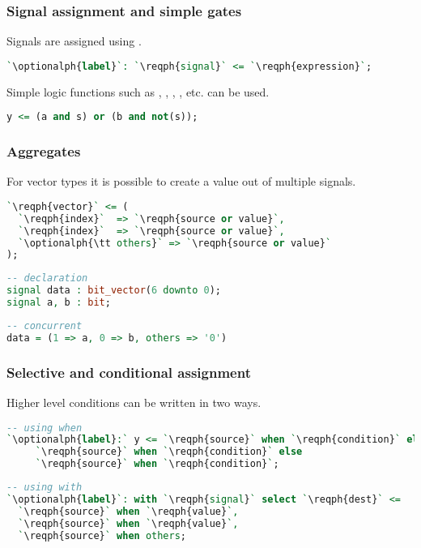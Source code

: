 \subsubsection{Signal assignment and simple gates}
Signals are assigned using \vhdl{<=}.
\begin{lstlisting}[language=vhdl]
`\optionalph{label}`: `\reqph{signal}` <= `\reqph{expression}`;
\end{lstlisting}
Simple logic functions such as , , , ,
etc. can be used.
\begin{lstlisting}[language=vhdl]
 y <= (a and s) or (b and not(s));
\end{lstlisting}

\subsubsection{Aggregates}
For vector types it is possible to create a value out of multiple signals.
\begin{lstlisting}[language=vhdl]
`\reqph{vector}` <= (
  `\reqph{index}`  => `\reqph{source or value}`,
  `\reqph{index}`  => `\reqph{source or value}`,
  `\optionalph{\tt others}` => `\reqph{source or value}`
);
\end{lstlisting}
\begin{lstlisting}[language=vhdl]
-- declaration
signal data : bit_vector(6 downto 0);
signal a, b : bit;
\end{lstlisting}
\begin{lstlisting}[language=vhdl]
-- concurrent
data = (1 => a, 0 => b, others => '0')
\end{lstlisting}

\subsubsection{Selective and conditional assignment}
Higher level conditions can be written in two ways. 
\begin{lstlisting}[language=vhdl]
-- using when
`\optionalph{label}:` y <= `\reqph{source}` when `\reqph{condition}` else
     `\reqph{source}` when `\reqph{condition}` else
     `\reqph{source}` when `\reqph{condition}`;
\end{lstlisting}
\begin{lstlisting}[language=vhdl]
-- using with
`\optionalph{label}`: with `\reqph{signal}` select `\reqph{dest}` <= 
  `\reqph{source}` when `\reqph{value}`,
  `\reqph{source}` when `\reqph{value}`,
  `\reqph{source}` when others;
\end{lstlisting}

